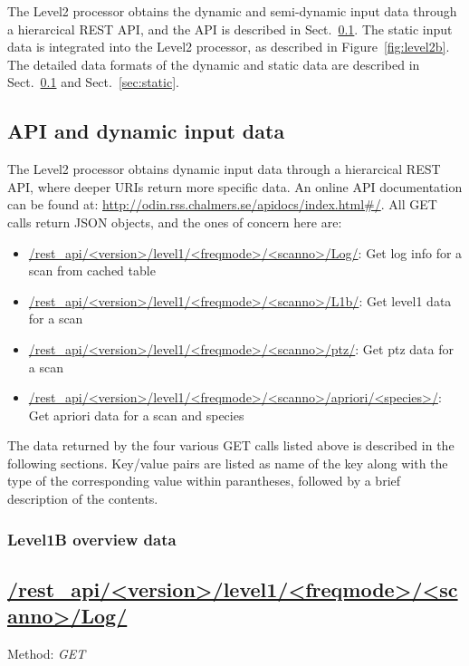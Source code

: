 The Level2 processor obtains the dynamic 
and semi-dynamic input data through a hierarcical
REST API, and the API is described in Sect.~\ref{sec:api}.
The static input data is integrated into the
Level2 processor, as described in Figure~\ref{fig:level2b}. 
The detailed data formats of the dynamic 
and static data are described in 
Sect.~\ref{sec:api} and Sect.~\ref{sec:static}.


\clearpage
\newpage
\subsection{API and dynamic input data}
\label{sec:api}

The Level2 processor obtains dynamic input data through
a hierarcical REST API, where deeper URIs return more
specific data. An online API documentation can be found at:
\url{http://odin.rss.chalmers.se/apidocs/index.html#/}.
All GET calls return JSON objects, and the ones of concern here
are:  

\begin{itemize}
    \item \url{/rest_api/<version>/level1/<freqmode>/<scanno>/Log/}: Get log info for a scan from cached table
    \item \url{/rest_api/<version>/level1/<freqmode>/<scanno>/L1b/}: Get level1 data for a scan
    \item \url{/rest_api/<version>/level1/<freqmode>/<scanno>/ptz/}: Get ptz data for a scan
    \item \url{/rest_api/<version>/level1/<freqmode>/<scanno>/apriori/<species>/}: Get apriori data for a scan and species
\end{itemize}
 

The data returned by the four various GET calls listed above 
is described in the following sections.
Key/value pairs are listed as name of the key
along with the type of the corresponding value within parantheses, followed
by a brief description of the contents.

\subsubsection{Level1B overview data}

\subsection*{\url{/rest_api/<version>/level1/<freqmode>/<scanno>/Log/}}
Method: \emph{GET}

